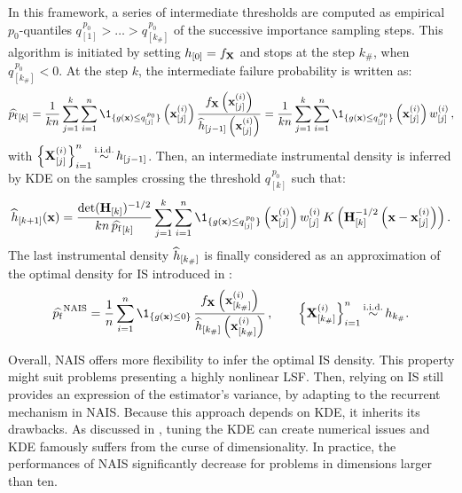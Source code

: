 In this framework, a series of intermediate thresholds are computed as empirical $p_0$-quantiles $q_{[1]}^{\, p_0} > \dots > q_{[k_\#]}^{\, p_0}$ of the successive importance sampling steps. 
This algorithm is initiated by setting $h_{[0]} = f_{\bf X}$ and stops at the step $k_\#$, when  $q_{[k_\#]}^{\, p_0} < 0$.
At the step $k$, the intermediate failure probability is written as: 
\begin{equation}
    \what{\pf}_{[k]} = \frac{1}{k n} \sum_{j=1}^{k} \sum_{i=1}^{n} \1_{\{g(\bx) \leq q_{[j]}^{\, p_0}\}}\left(\bx^{(i)}_{[j]}\right) \frac{f_\bX\left(\bx^{(i)}_{[j]}\right)}{\what{h}_{[j-1]}\left(\bx^{(i)}_{[j]}\right)}
    = \frac{1}{k n} \sum_{j=1}^{k} \sum_{i=1}^{n} \1_{\{g(\bx) \leq q_{[j]}^{\, p_0}\}}\left(\bx^{(i)}_{[j]}\right) w^{(i)}_{[j]} \, , 
\end{equation}
with $\left\{{\bf X}_{[j]}^{(i)}\right\}_{i=1}^n \mathop{\sim}\limits^{\mathrm{i.i.d.}} h_{[j-1]}$. 
Then, an intermediate instrumental density is inferred by KDE on the samples crossing the threshold $q_{[k]}^{\, p_0}$ such that:
\begin{equation}
    \what{h}_{[k+1]}(\bx) = \frac{\mathrm{det}(\bH_{[k]})^{-1/2}}{k n \, \what{\pf}_{[k]}} \sum_{j=1}^{k} \sum_{i=1}^{n} 
            \1_{\{g(\bx) \leq q_{[j]}^{\, p_0}\}}\left(\bx^{(i)}_{[j]}\right) w^{(i)}_{[j]} \, K\left(\bH_{[k]}^{-1/2} \left(\bx - \bx^{(i)}_{[j]}\right)\right).
\end{equation} 
The last instrumental density $\widehat{h}_{[k_{\#}]}$ is finally considered as an approximation of the optimal density for IS introduced in : 
\begin{equation}\label{eq:pf_NAIS}
    \what{\pf}^{\mathrm{NAIS}} = \frac1n \sum_{i=1}^{n} \1_{\{g(\bx) \leq 0\}} \,
                                                 \frac{f_\bX\left(\bx^{(i)}_{[k_{\#}]}\right)}{\what{h}_{[k_{\#}]}\left(\bx^{(i)}_{[k_{\#}]}\right)} \, , \qquad
                                                 \left\{\bX_{[k_{\#}]}^{(i)}\right\}_{i=1}^n \simiid h_{k_{\#}}.
\end{equation}

Overall, NAIS offers more flexibility to infer the optimal IS density. 
This property might suit problems presenting a highly nonlinear LSF. 
Then, relying on IS still provides an expression of the estimator's variance, by adapting  to the recurrent mechanism in NAIS. 
Because this approach depends on KDE, it inherits its drawbacks. 
As discussed in \citet{Morio_RESS_2011}, tuning the KDE can create numerical issues and KDE famously suffers from the curse of dimensionality. 
In practice, the performances of NAIS significantly decrease for problems in dimensions larger than ten. 

